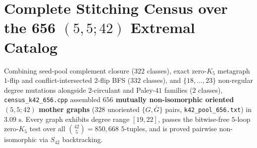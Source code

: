 \documentclass[11pt,a4paper]{article}
\theoremstyle{plain}
\theoremstyle{definition}
\begin{document}
\begin{table}[htbp]
\centering
\caption{Complete exhaustive Hamming ball census around $G^*_1$ ($0.54\text{ s}$, $235.47\text{ M states/s}$) and $G^*_2$ ($0.53\text{ s}$, $236.10\text{ M states/s}$), totaling $252,083,534$ verified states.}
\label{tab:hamming-ball}
\end{table}

\section{Complete Stitching Census over the 656 \texorpdfstring{$(5,5;42)$}{(5,5;42)} Extremal Catalog}
\label{sec:census-656}

Combining seed-pool complement closure ($322$ classes), exact zero-$K_5$ metagraph $1$-flip and conflict-intersected $2$-flip BFS ($332$ classes), and $\{18,\dots,23\}$ non-regular degree mutations alongside $2$-circulant and Paley-$41$ families ($2$ classes), \texttt{census\_\allowbreak k42\_\allowbreak 656.cpp} assembled \textbf{$656$ mutually non-isomorphic oriented $(5,5;42)$ mother graphs} ($328$ unoriented $\{G, \bar{G}\}$ pairs, \texttt{k42\_\allowbreak pool\_\allowbreak 656.txt}) in $3.09\text{ s}$. Every graph exhibits degree range $[19,22]$, passes the bitwise-free $5$-loop zero-$K_5$ test over all $\binom{42}{5} = 850,668$ $5$-tuples, and is proved pairwise non-isomorphic via $S_{42}$ backtracking.
\end{document}
